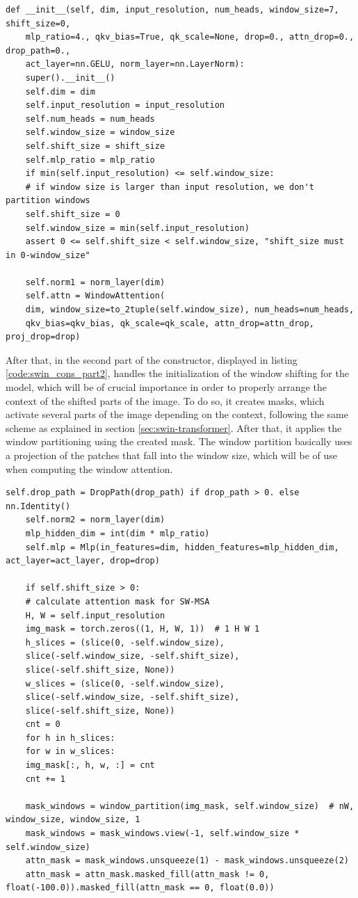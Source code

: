 \begin{lstlisting}[caption={First part of the SWIN block constructor}, label={code:swin_cons_part1}]
	def __init__(self, dim, input_resolution, num_heads, window_size=7, shift_size=0,
	mlp_ratio=4., qkv_bias=True, qk_scale=None, drop=0., attn_drop=0., drop_path=0.,
	act_layer=nn.GELU, norm_layer=nn.LayerNorm):
	super().__init__()
	self.dim = dim
	self.input_resolution = input_resolution
	self.num_heads = num_heads
	self.window_size = window_size
	self.shift_size = shift_size
	self.mlp_ratio = mlp_ratio
	if min(self.input_resolution) <= self.window_size:
	# if window size is larger than input resolution, we don't partition windows
	self.shift_size = 0
	self.window_size = min(self.input_resolution)
	assert 0 <= self.shift_size < self.window_size, "shift_size must in 0-window_size"
	
	self.norm1 = norm_layer(dim)
	self.attn = WindowAttention(
	dim, window_size=to_2tuple(self.window_size), num_heads=num_heads,
	qkv_bias=qkv_bias, qk_scale=qk_scale, attn_drop=attn_drop, proj_drop=drop)
\end{lstlisting}

After that, in the second part of the constructor, displayed in listing \ref{code:swin_cons_part2}, handles the initialization of the window shifting for the  model, which will be of crucial importance in order to properly arrange the context of the shifted parts of the image. To do so, it creates masks, which activate several parts of the image depending on the context, following the same scheme as explained in section \ref{sec:swin-transformer}. After that, it applies the window partitioning using the created mask. The window partition basically uses a projection of the patches that fall into the window size, which will be of use when computing the window attention.

\begin{lstlisting}[caption={Second part of the SWIN block model}, label={code:swin_cons_part2}]
	self.drop_path = DropPath(drop_path) if drop_path > 0. else nn.Identity()
	self.norm2 = norm_layer(dim)
	mlp_hidden_dim = int(dim * mlp_ratio)
	self.mlp = Mlp(in_features=dim, hidden_features=mlp_hidden_dim, act_layer=act_layer, drop=drop)
	
	if self.shift_size > 0:
	# calculate attention mask for SW-MSA
	H, W = self.input_resolution
	img_mask = torch.zeros((1, H, W, 1))  # 1 H W 1
	h_slices = (slice(0, -self.window_size),
	slice(-self.window_size, -self.shift_size),
	slice(-self.shift_size, None))
	w_slices = (slice(0, -self.window_size),
	slice(-self.window_size, -self.shift_size),
	slice(-self.shift_size, None))
	cnt = 0
	for h in h_slices:
	for w in w_slices:
	img_mask[:, h, w, :] = cnt
	cnt += 1
	
	mask_windows = window_partition(img_mask, self.window_size)  # nW, window_size, window_size, 1
	mask_windows = mask_windows.view(-1, self.window_size * self.window_size)
	attn_mask = mask_windows.unsqueeze(1) - mask_windows.unsqueeze(2)
	attn_mask = attn_mask.masked_fill(attn_mask != 0, float(-100.0)).masked_fill(attn_mask == 0, float(0.0))
\end{lstlisting}

